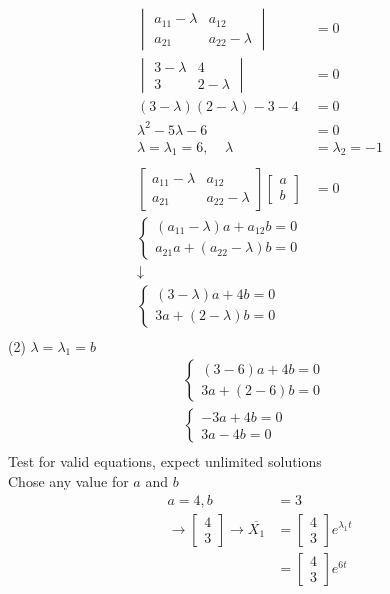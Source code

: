 \documentclass[10pt, letterpaper]{article}
\begin{document}
\begin{align*}
\begin{vmatrix}
	a_{11}-\lambda & a_{12}\\
	a_{21} & a_{22}-\lambda
\end{vmatrix} &= 0\\
\begin{vmatrix}
	3-\lambda & 4\\
	3 & 2-\lambda
\end{vmatrix} &= 0\\
(3-\lambda)(2-\lambda)-3-4 &= 0\\
\lambda^2-5\lambda-6 &= 0\\
\lambda = \lambda_1 = 6, ~~~~~ \lambda &= \lambda_2 = -1\\
\\
\begin{bmatrix}
	a_{11}-\lambda & a_{12}\\
	a_{21} & a_{22}-\lambda
\end{bmatrix} \begin{bmatrix}
	a\\
	b
\end{bmatrix} &= 0\\
\begin{cases}
	(a_{11}-\lambda)a+a_{12}b=0\\
	a_{21}a+(a_{22}-\lambda)b=0
\end{cases}&\\
\downarrow ~~~~~~~~~~ &\\
\begin{cases}
	(3-\lambda)a+4b=0\\
	3a+(2-\lambda)b=0
\end{cases}& \\
\end{align*}
(2) $\lambda = \lambda_1=b$\\
\begin{align*}
\begin{cases}
	(3-6)a+4b=0\\
	3a+(2-6)b=0
\end{cases}& \\
\begin{cases}
	-3a+4b=0\\
	3a-4b=0
\end{cases}& \\
\end{align*}
Test for valid equations, expect unlimited solutions\\
Chose any value for $a$ and $b$\\
\begin{align*}
a= 4, b &= 3 \\
\rightarrow \begin{bmatrix}
	4\\
	3
\end{bmatrix} \rightarrow \overline{X_1} &= \begin{bmatrix}
	4\\
	3
\end{bmatrix} e^{\lambda_1 t}\\
&= \begin{bmatrix}
	4\\
	3
\end{bmatrix}
	e^{6t}
\end{align*}
\end{document}
